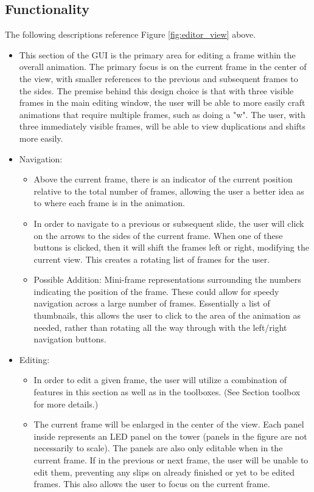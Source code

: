 \documentclass[12pt]{extarticle}
\begin{document}
	\subsection{Functionality}
	The following descriptions reference Figure \ref{fig:editor_view} above.
	\begin{itemize}
		\item This section of the GUI is the primary area for editing a frame within the overall animation. The primary focus is on the current frame in the center of the view, with smaller references to the previous and subsequent frames to the sides.  The premise behind this design choice is that with three visible frames in the main editing window, the user will be able to more easily craft animations that require multiple frames, such as doing a "w".  The user, with three immediately visible frames, will be able to view duplications and shifts more easily.
		\item Navigation:
		\begin{itemize}
			\item Above the current frame, there is an indicator of the current position relative to the total number of frames, allowing the user a better idea as to where each frame is in the animation.
			\item In order to navigate to a previous or subsequent slide, the user will click on the arrows to the sides of the current frame.  When one of these buttons is clicked, then it will shift the frames left or right, modifying the current view.  This creates a rotating list of frames for the user.
			\item Possible Addition: Mini-frame representations surrounding the numbers indicating the position of the frame. These could allow for speedy navigation across a large number of frames.  Essentially a list of thumbnails, this allows the user to click to the area of the animation as needed, rather than rotating all the way through with the left/right navigation buttons.
		\end{itemize}
		\item Editing:
		\begin{itemize}
			\item In order to edit a given frame, the user will utilize a combination of features in this section as well as in the toolboxes. (See Section toolbox for more details.)
			\item The current frame will be enlarged in the center of the view. Each panel inside represents an LED panel on the tower (panels in the figure are not necessarily to scale).  The panels are also only editable when in the current frame.  If in the previous or next frame, the user will be unable to edit them, preventing any slips on already finished or yet to be edited frames.  This also allows the user to focus on the current frame.

\end{itemize}
\end{itemize}
\end{document}
